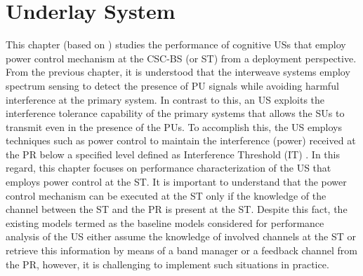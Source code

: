 \chapter{Underlay System}
\label{chap:US}


This chapter (based on ) studies the performance of cognitive USs that employ power control mechanism at the CSC-BS (or ST) from a deployment perspective. 
From the previous chapter, it is understood that the interweave systems employ spectrum sensing to detect the presence of PU signals while avoiding harmful interference at the primary system. In contrast to this, an US exploits the interference tolerance capability of the primary systems that allows the SUs to transmit even in the presence of the PUs. To accomplish this, the US employs techniques such as power control to maintain the interference (power) received at the PR below a specified level defined as Interference Threshold (IT) \cite{Xing07}. In this regard, this chapter focuses on performance characterization of the US that employs power control at the ST. It is important to understand that the power control mechanism can be executed at the ST only if the knowledge of the channel between the ST and the PR is present at the ST. Despite this fact, the existing models termed as the baseline models considered for performance analysis of the US either assume the knowledge of involved channels at the ST or retrieve this information by means of a band manager or a feedback channel from the PR, however, it is challenging to implement such situations in practice. 

